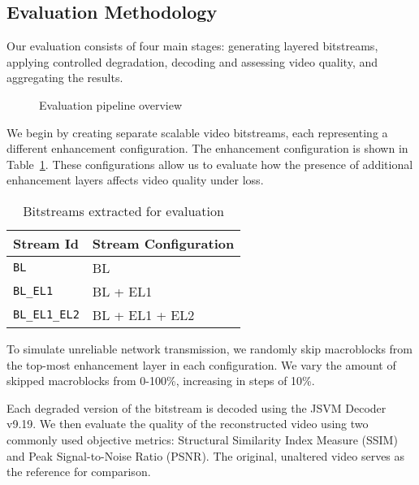     \subsection{Evaluation Methodology}
        Our evaluation consists of four main stages: generating layered bitstreams,
        applying controlled degradation, decoding and assessing video quality, and
        aggregating the results.

        \begin{figure}[H]
            \centering
            \caption{Evaluation pipeline overview}
            \label{fig:evaluation_pipeline}
        \end{figure}

        We begin by creating separate scalable video bitstreams, each
        representing a different enhancement configuration. The enhancement
        configuration is shown in Table~\ref{tab:bitstreams}.  These
        configurations allow us to evaluate how the presence of additional
        enhancement layers affects video quality under loss.


        \begin{table}[H]
            \centering
            \begin{tabular}{ll}
                \toprule
                Stream Id               & Stream Configuration   \\
                \midrule
                \texttt{BL}             & BL                \\
                \texttt{BL\_EL1}        & BL + EL1          \\
                \texttt{BL\_EL1\_EL2}   & BL + EL1 + EL2    \\
                \bottomrule
            \end{tabular}
            \caption{Bitstreams extracted for evaluation}
            \label{tab:bitstreams}
        \end{table}
        

        To simulate unreliable network transmission, we randomly skip
        macroblocks from the top-most enhancement layer in each configuration.
        We vary the amount of skipped macroblocks from 0-100\%, increasing
        in steps of 10\%.

        Each degraded version of the bitstream is decoded using the JSVM Decoder
        v9.19.  We then evaluate the quality of the reconstructed video using
        two commonly used objective metrics: Structural Similarity Index Measure
        (SSIM) and Peak Signal-to-Noise Ratio (PSNR). The original, unaltered
        video serves as the reference for comparison.

